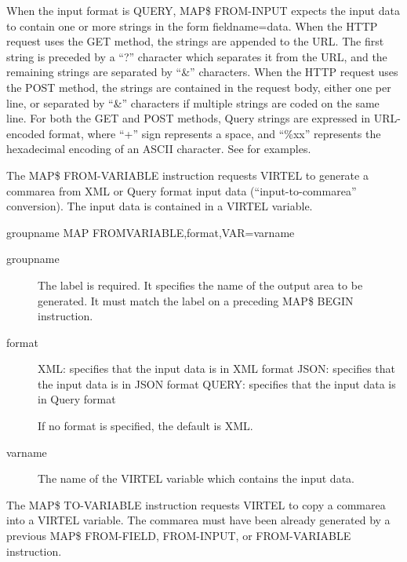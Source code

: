 \documentclass[letterpaper,10pt,english]{sphinxmanual}
\begin{document}
When the input format is QUERY, MAP\$ FROM-INPUT expects the input data to contain one or more strings in the form fieldname=data. When the HTTP request uses the GET method, the strings are appended to the URL. The first string is preceded by a “?” character which separates it from the URL, and the remaining strings are separated by “\&” characters. When the HTTP request uses the POST method, the strings are contained in the request body, either one per line, or separated by “\&” characters if multiple strings are coded on the same line. For both the GET and POST methods, Query strings are expressed in URL-encoded format, where “+” sign represents a space, and “\%xx” represents the hexadecimal encoding of an ASCII character. See {\hyperref[\detokenize{User_Guide:v457ug-parsing-query-input}]{}} for examples.
\label{\detokenize{User_Guide:v457ug-map-from-variable}}

The MAP\$ FROM-VARIABLE instruction requests VIRTEL to generate a commarea from XML or Query format input data (“input-to-commarea” conversion). The input data is contained in a VIRTEL variable.

\begin{sphinxVerbatim}[commandchars=\\\{\}]
groupname MAP\PYGZdl{} FROM\PYGZhy{}VARIABLE,format,VAR=\PYGZsq{}varname\PYGZsq{}
\end{sphinxVerbatim}
\begin{description}
\item[{groupname}] \leavevmode
The label is required. It specifies the name of the output area to be generated. It must match the label on a preceding MAP\$ BEGIN instruction.

\item[{format}] \leavevmode
XML: specifies that the input data is in XML format
JSON: specifies that the input data is in JSON format
QUERY: specifies that the input data is in Query format

If no format is specified, the default is XML.

\item[{varname}] \leavevmode
The name of the VIRTEL variable which contains the input data.

\end{description}


The MAP\$ TO-VARIABLE instruction requests VIRTEL to copy a commarea into a VIRTEL variable. The commarea must have been already generated by a previous MAP\$ FROM-FIELD, FROM-INPUT, or FROM-VARIABLE instruction.
\end{document}
